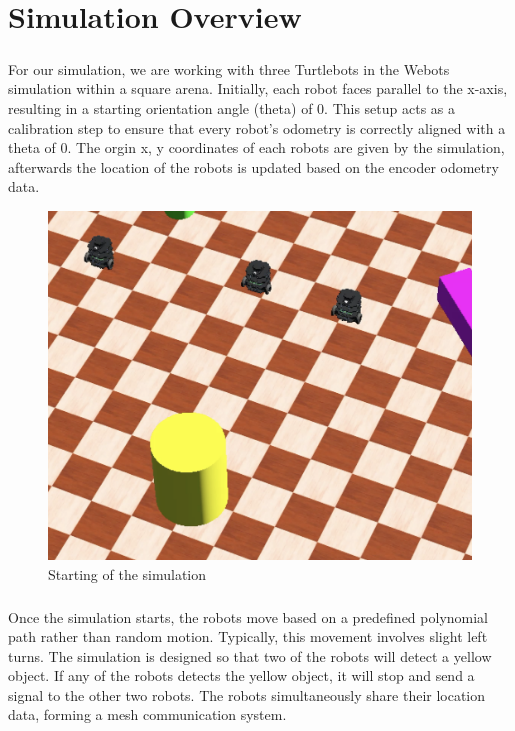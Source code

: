 \chapter{Simulation Overview}

\paragraph*{}
For our simulation, we are working with three Turtlebots in the Webots simulation within a square arena. Initially, each robot faces parallel to the x-axis, resulting in a starting orientation angle (theta) of 0. This setup acts as a calibration step to ensure that every robot's odometry is correctly aligned with a theta of 0. The orgin x, y coordinates of each robots are given by the simulation, afterwards the location of the robots is updated based on the encoder odometry data. 

\begin{figure} [H]
    \centering
    \includegraphics[width=0.6\linewidth]{assets/images/simulation_overview/bothdetect.png}
    \caption{Starting of the simulation}
    \label{fig:start-sim}
\end{figure}

\paragraph*{}
Once the simulation starts, the robots move based on a predefined polynomial path rather than random motion. Typically, this movement involves slight left turns. The simulation is designed so that two of the robots will detect a yellow object. If any of the robots detects the yellow object, it will stop and send a signal to the other two robots. The robots simultaneously share their location data, forming a mesh communication system.

